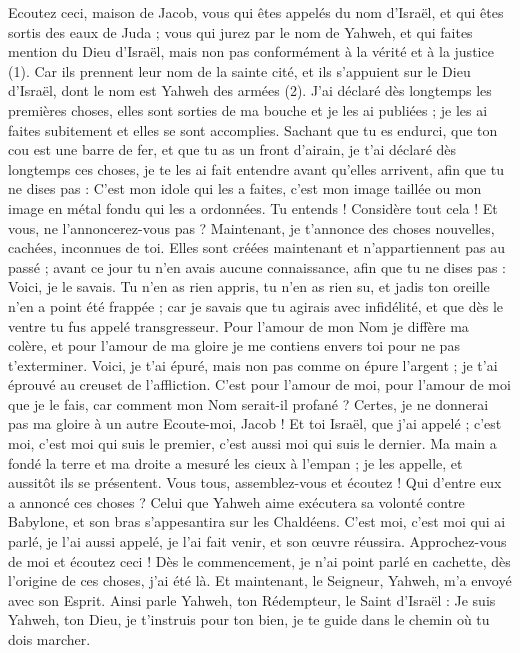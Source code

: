 \begin{multicols}{2}
\VerseOne{}Ecoutez ceci, maison de Jacob, vous qui êtes appelés du nom d'Israël, et qui êtes sortis des eaux de Juda ; vous qui jurez par le nom de Yahweh, et qui faites mention du Dieu d'Israël, mais non pas conformément à la vérité et à la justice (1).
Car ils prennent leur nom de la sainte cité, et ils s'appuient sur le Dieu d'Israël, dont le nom est Yahweh des armées (2).
J'ai déclaré dès longtemps les premières choses, elles sont sorties de ma bouche et je les ai publiées ; je les ai faites subitement et elles se sont accomplies.
Sachant que tu es endurci, que ton cou est une barre de fer, et que tu as un front d'airain,
je t'ai déclaré dès longtemps ces choses, je te les ai fait entendre avant qu’elles arrivent, afin que tu ne dises pas : C’est mon idole qui les a faites, c’est mon image taillée ou mon image en métal fondu qui les a ordonnées.
Tu entends ! Considère tout cela ! Et vous, ne l'annoncerez-vous pas ? Maintenant, je t’annonce des choses nouvelles, cachées, inconnues de toi.
Elles sont créées maintenant et n’appartiennent pas au passé ; avant ce jour tu n’en avais aucune connaissance, afin que tu ne dises pas : Voici, je le savais.
Tu n’en as rien appris, tu n’en as rien su, et jadis ton oreille n’en a point été frappée ; car je savais que tu agirais avec infidélité, et que dès le ventre tu fus appelé transgresseur.
Pour l'amour de mon Nom je diffère ma colère, et pour l'amour de ma gloire je me contiens envers toi pour ne pas t’exterminer.
Voici, je t'ai épuré, mais non pas comme on épure l'argent ; je t'ai éprouvé au creuset de l'affliction.
C’est pour l'amour de moi, pour l'amour de moi que je le fais, car comment mon Nom serait-il profané ? Certes, je ne donnerai pas ma gloire à un autre
Ecoute-moi, Jacob ! Et toi Israël, que j’ai appelé ; c'est moi, c’est moi qui suis le premier, c’est aussi moi qui suis le dernier.
Ma main a fondé la terre et ma droite a mesuré les cieux à l'empan ; je les appelle, et aussitôt ils se présentent.
Vous tous, assemblez-vous et écoutez ! Qui d’entre eux a annoncé ces choses ? Celui que Yahweh aime exécutera sa volonté contre Babylone, et son bras s’appesantira sur les Chaldéens.
C'est moi, c'est moi qui ai parlé, je l'ai aussi appelé, je l'ai fait venir, et son œuvre réussira.
Approchez-vous de moi et écoutez ceci ! Dès le commencement, je n'ai point parlé en cachette, dès l’origine de ces choses, j’ai été là. Et maintenant, le Seigneur, Yahweh, m’a envoyé avec son Esprit.
Ainsi parle Yahweh, ton Rédempteur, le Saint d'Israël : Je suis Yahweh, ton Dieu, je t’instruis pour ton bien, je te guide dans le chemin où tu dois marcher.

\end{multicols}
